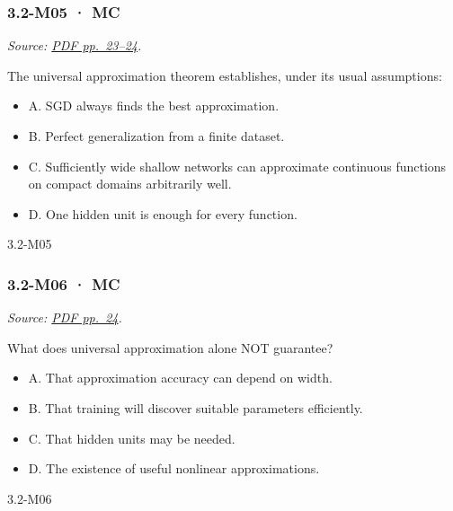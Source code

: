 \noindent\begin{minipage}{\linewidth}

\subsubsection{3.2-M05 · MC}\label{m05-mc-8}

\emph{Source:
\href{../Lecture\%20Slides/3.2.\%20Shallow\%20NN.pdf\#page=23}{PDF
pp.~23--24}.}

The universal approximation theorem establishes, under its usual
assumptions:

\begin{itemize}
\tightlist
\item
  A. SGD always finds the best approximation.
\item
  B. Perfect generalization from a finite dataset.
\item
  C. Sufficiently wide shallow networks can approximate continuous
  functions on compact domains arbitrarily well.
\item
  D. One hidden unit is enough for every function.
\end{itemize}

\begin{solution}[8mm]{3.2-M05}

\end{solution}
\end{minipage}\par\medskip

\noindent\begin{minipage}{\linewidth}

\subsubsection{3.2-M06 · MC}\label{m06-mc-8}

\emph{Source:
\href{../Lecture\%20Slides/3.2.\%20Shallow\%20NN.pdf\#page=24}{PDF
pp.~24}.}

What does universal approximation alone NOT guarantee?

\begin{itemize}
\tightlist
\item
  A. That approximation accuracy can depend on width.
\item
  B. That training will discover suitable parameters efficiently.
\item
  C. That hidden units may be needed.
\item
  D. The existence of useful nonlinear approximations.
\end{itemize}

\begin{solution}[8mm]{3.2-M06}

\end{solution}
\end{minipage}\par\medskip

